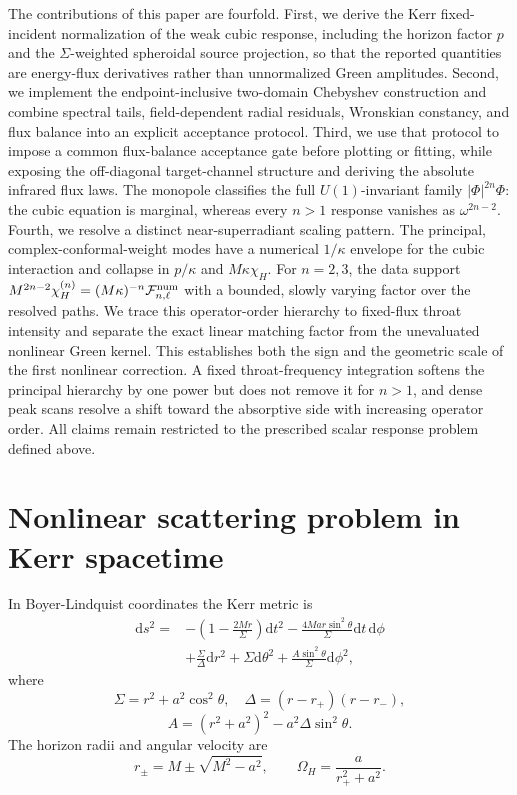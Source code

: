 \documentclass[aps,prd,twocolumn,10pt,nofootinbib,superscriptaddress,floatfix]{revtex4-2}
\newcommand{\dd}{\mathrm{d}}
\newcommand{\rp}{r_+}
\newcommand{\rmn}{r_-}
\newcommand{\DeltaK}{\Delta}
\begin{document}
The contributions of this paper are fourfold.  First, we derive the Kerr
fixed-incident normalization of the weak cubic response, including the horizon
factor $p$ and the $\Sigma$-weighted spheroidal source projection, so that the
reported quantities are energy-flux derivatives rather than unnormalized Green
amplitudes.  Second, we implement the endpoint-inclusive two-domain
Chebyshev construction and combine spectral tails, field-dependent radial
residuals, Wronskian constancy, and flux balance into an explicit acceptance
protocol.  Third, we use that protocol to impose a common flux-balance
acceptance gate before plotting or fitting, while exposing the off-diagonal
target-channel structure and deriving the absolute infrared flux laws.  The
monopole classifies the full $U(1)$-invariant family
$|\Phi|^{2n}\Phi$: the cubic equation is marginal, whereas every $n>1$
response vanishes as $\omega^{2n-2}$.  Fourth, we resolve a distinct
near-superradiant scaling pattern.  The principal,
complex-conformal-weight modes have a numerical $1/\kappa$ envelope for the
cubic interaction and collapse in $p/\kappa$ and $M\kappa\chi_H$.  For
$n=2,3$, the data support
$M^{2n-2}\chi_H^{(n)}=(M\kappa)^{-n}{\cal F}^{\rm num}_{n,\ell}$ with a bounded,
slowly varying factor over the resolved paths.  We trace this operator-order
hierarchy to fixed-flux throat intensity and separate the exact linear matching
factor from the unevaluated nonlinear Green kernel.  This establishes
both the sign and the geometric scale of the first nonlinear correction.  A
fixed throat-frequency integration softens the principal hierarchy by one
power but does not remove it for $n>1$, and dense peak scans resolve a shift
toward the absorptive side with increasing operator order.  All claims remain
restricted to the prescribed scalar response problem defined above.

\section{Nonlinear scattering problem in Kerr spacetime}
\label{sec:problem}

In Boyer-Lindquist coordinates the Kerr metric is
\begin{align}
\dd s^2={}&-\left(1-\frac{2Mr}{\Sigma}\right)\dd t^2
-\frac{4Mar\sin^2\theta}{\Sigma}\dd t\,\dd\phi
\nonumber\\
&+\frac{\Sigma}{\DeltaK}\dd r^2+\Sigma\dd\theta^2
+\frac{A\sin^2\theta}{\Sigma}\dd\phi^2 ,
\end{align}
where
\begin{equation}
\Sigma=r^2+a^2\cos^2\theta,\quad
\DeltaK=(r-\rp)(r-\rmn),
\end{equation}
\begin{equation}
A=(r^2+a^2)^2-a^2\DeltaK\sin^2\theta .
\end{equation}
The horizon radii and angular velocity are
\begin{equation}
r_\pm=M\pm\sqrt{M^2-a^2},\qquad
\Omega_H=\frac{a}{\rp^2+a^2}.
\end{equation}
\end{document}
